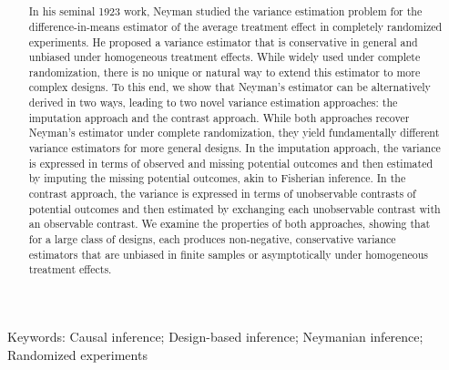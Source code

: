 \documentclass[12pt]{article}
\begin{document}
\blind
\title{\bf \tit}
\maketitle
\fi

\begin{abstract}
In his seminal 1923 work, Neyman studied the variance estimation problem for the difference-in-means estimator of the average treatment effect in completely randomized experiments. He proposed a variance estimator that is conservative in general and unbiased under homogeneous treatment effects. While widely used under complete randomization, there is no unique or natural way to extend this estimator to more complex designs. To this end, we show that Neyman's estimator can be alternatively derived in two ways, leading to two novel variance estimation approaches: the imputation approach and the contrast approach. While both approaches recover Neyman's estimator under complete randomization, they yield fundamentally different variance estimators for more general designs. In the imputation approach, the variance is expressed in terms of observed and missing potential outcomes and then estimated by imputing the missing potential outcomes, akin to Fisherian inference. In the contrast approach, the variance is expressed in terms of unobservable contrasts of potential outcomes and then estimated by exchanging each unobservable contrast with an observable contrast. We examine the properties of both approaches, showing that for a large class of designs, each produces non-negative, conservative variance estimators that are unbiased in finite samples or asymptotically under homogeneous treatment effects.
\end{abstract}



\begin{center}
\noindent Keywords:
{Causal inference; Design-based inference; Neymanian inference; Randomized experiments}
\end{center}
\clearpage
\doublespacing






\newpage
\end{document}
